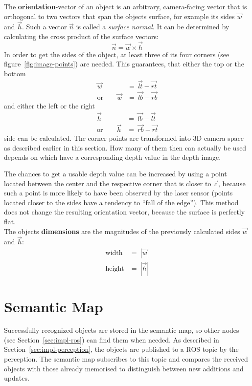 The \textbf{orientation}-vector of an object is an arbitrary, camera-facing vector that is orthogonal to two vectors that span the objects surface, for example its sides $\overrightarrow{w}$ and $\overrightarrow{h}$. Such a vector $\overrightarrow{n}$ is called a \textit{surface normal}. It can be determined by calculating the cross product of the surface vectors:
\begin{equation*}
  \overrightarrow{n} = \overrightarrow{w} \times \overrightarrow{h}
\end{equation*}
In order to get the sides of the object, at least three of its four corners (see figure~\ref{fig:image-points}) are needed. This guarantees, that either the top or the bottom
\begin{eqnarray*}
                  \overrightarrow{w} &=\ \overrightarrow{lt} - \overrightarrow{rt} \\
  \text{or}\qquad \overrightarrow{w} &=\ \overrightarrow{lb} - \overrightarrow{rb}
\end{eqnarray*}
and either the left or the right
\begin{eqnarray*}
                  \overrightarrow{h} &=\ \overrightarrow{lb} - \overrightarrow{lt} \\
  \text{or}\qquad \overrightarrow{h} &=\ \overrightarrow{rb} - \overrightarrow{rt}
\end{eqnarray*}
side can be calculated. The corner points are transformed into 3D camera space as described earlier in this section. How many of them then can actually be used depends on which have a corresponding depth value in the depth image.

The chances to get a usable depth value can be increased by using a point located between the center and the respective corner that is closer to $\overrightarrow{c}$, because such a point is more likely to have been observed by the laser sensor (points located closer to the sides have a tendency to ``fall of the edge''). This method does not change the resulting orientation vector, because the surface is perfectly flat. \\

The objects \textbf{dimensions} are the magnitudes of the previously calculated sides $\overrightarrow{w}$ and $\overrightarrow{h}$:
\begin{eqnarray*}
  \text{width}  &=\ |\overrightarrow{w}| \\
  \text{height} &=\ |\overrightarrow{h}|
\end{eqnarray*}


\section{Semantic Map}
\label{sec:impl-map}
Successfully recognized objects are stored in the semantic map, so other nodes (see Section~\ref{sec:impl-ros}) can find them when needed. As described in Section~\ref{sec:impl-perception}, the objects are published to a ROS topic by the perception. The semantic map subscribes to this topic and compares the received objects with those already memorised to distinguish between new additions and updates. \\

